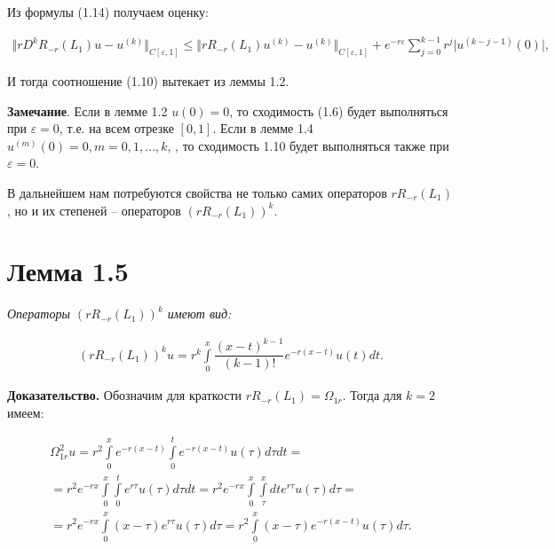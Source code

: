 Из формулы (1.14) получаем оценку:

\begin{equation}
\begin{array}{c}
\nonumber

\bigl\Vert rD^kR_{-r}(L_1)u - u^{(k)}\bigr\Vert_{C[\varepsilon ,1]} \leq \bigl\Vert rR_{-r}(L_1)u^{(k)} - u^{(k)}\bigr\Vert_{C[\varepsilon ,1]} + e^{-r\varepsilon}\sum\limits_{j=0}^{k-1} r^j\vert u^{(k-j-1)}(0)\vert,

\end{array}
\end{equation}

И тогда соотношение (1.10) вытекает из леммы 1.2.

\textbf{Замечание}. Если в лемме 1.2 $ u(0) = 0 $, то сходимость (1.6) будет выполняться при $ \varepsilon = 0$, т.е. на всем отрезке $ [0,1] $. Если в лемме 1.4 $ u^{(m)}(0) = 0, m = 0,1,...,k $, , то сходимость 1.10 будет выполняться также при $ \varepsilon = 0 $.

В дальнейшем нам потребуются свойства не только самих операторов $ rR_{-r}(L_1) $, но и их степеней – операторов $ (rR_{-r}(L_1))^k $.

\section{Лемма 1.5}
\label{lemma1.5}

\textit{Операторы $ (rR_{-r}(L_1))^k $ имеют вид:}

\begin{equation}
\begin{array}{c}

(rR_{-r}(L_1))^ku = r^k\int\limits_0^x \dfrac{(x-t)^{k-1}}{(k-1)!}e^{-r(x-t)}u(t)dt.

\end{array}
\end{equation}

\textbf{Доказательство.} Обозначим для краткости $ rR_{-r}(L_1) = \Omega_{1r} $. Тогда для $ k = 2 $ имеем:

\begin{equation}
\begin{array}{c}
\nonumber

\Omega_{1r}^2u = r^2\int\limits_0^x e^{-r(x-t)} \int\limits_0^t e^{-r(x-t)} u(\tau)d\tau dt = \\
= r^2e^{-rx}\int\limits_0^x\int\limits_0^t e^{r\tau}u(\tau)d\tau dt = r^2e^{-rx}\int\limits_0^x\int\limits_\tau^x dte^{r\tau}u(\tau)d\tau = \\
= r^2e^{-rx}\int\limits_0^x (x-\tau)e^{r\tau}u(\tau)d\tau = r^2\int\limits_0^x (x-\tau)e^{-r(x-t)}u(\tau)d\tau .

\end{array}
\end{equation}


